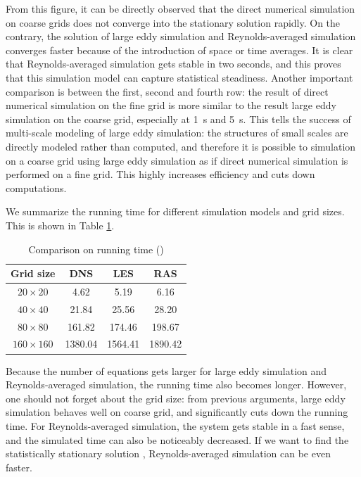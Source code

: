\documentclass[english, nochinese]{pkupaper}
\begin{document}
From this figure, it can be directly observed that the direct numerical simulation on coarse grids does not converge into the stationary solution rapidly. On the contrary, the solution of large eddy simulation and Reynolds-averaged simulation converges faster because of the introduction of space or time averages. It is clear that Reynolds-averaged simulation gets stable in two seconds, and this proves that this simulation model can capture statistical steadiness. Another important comparison is between the first, second and fourth row: the result of direct numerical simulation on the fine grid is more similar to the result large eddy simulation on the coarse grid, especially at \SI{1}{\second} and \SI{5}{\second}. This tells the success of multi-scale modeling of large eddy simulation: the structures of small scales are directly modeled rather than computed, and therefore it is possible to simulation on a coarse grid using large eddy simulation as if direct numerical simulation is performed on a fine grid. This highly increases efficiency and cuts down computations.

We summarize the running time for different simulation models and grid sizes. This is shown in Table \ref{Tbl:Run}.

\begin{table}[htbp]
\centering
\caption{Comparison on running time (\Si{\second})}
\label{Tbl:Run}
\begin{tabular}{|c|c|c|c|}
\hline
Grid size & DNS & LES & RAS \\
\hline
$ 20 \times 20 $ & 4.62 & 5.19 & 6.16 \\
\hline
$ 40 \times 40 $ & 21.84 & 25.56 & 28.20 \\
\hline
$ 80 \times 80 $ & 161.82 & 174.46 & 198.67 \\
\hline
$ 160 \times 160 $ & 1380.04 & 1564.41 & 1890.42 \\
\hline
\end{tabular}
\end{table}

Because the number of equations gets larger for large eddy simulation and Reynolds-averaged simulation, the running time also becomes longer. However, one should not forget about the grid size: from previous arguments, large eddy simulation behaves well on coarse grid, and significantly cuts down the running time. For Reynolds-averaged simulation, the system gets stable in a fast sense, and the simulated time can also be noticeably decreased. If we want to find the statistically stationary solution , Reynolds-averaged simulation can be even faster.
\end{document}
